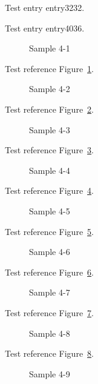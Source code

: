 Test entry \gls{entry3232}.

Test entry \gls{entry4036}.

\begin{figure}[tbhp]
\caption{Sample 4-1}
\label{fig:sample-4-1}
\end{figure}

Test reference Figure~\ref{fig:sample-4-1}.

\begin{figure}[tbhp]
\caption{Sample 4-2}
\label{fig:sample-4-2}
\end{figure}

Test reference Figure~\ref{fig:sample-4-2}.

\begin{figure}[tbhp]
\caption{Sample 4-3}
\label{fig:sample-4-3}
\end{figure}

Test reference Figure~\ref{fig:sample-4-3}.

\begin{figure}[tbhp]
\caption{Sample 4-4}
\label{fig:sample-4-4}
\end{figure}

Test reference Figure~\ref{fig:sample-4-4}.

\begin{figure}[tbhp]
\caption{Sample 4-5}
\label{fig:sample-4-5}
\end{figure}

Test reference Figure~\ref{fig:sample-4-5}.

\begin{figure}[tbhp]
\caption{Sample 4-6}
\label{fig:sample-4-6}
\end{figure}

Test reference Figure~\ref{fig:sample-4-6}.

\begin{figure}[tbhp]
\caption{Sample 4-7}
\label{fig:sample-4-7}
\end{figure}

Test reference Figure~\ref{fig:sample-4-7}.

\begin{figure}[tbhp]
\caption{Sample 4-8}
\label{fig:sample-4-8}
\end{figure}

Test reference Figure~\ref{fig:sample-4-8}.

\begin{figure}[tbhp]
\caption{Sample 4-9}
\label{fig:sample-4-9}
\end{figure}

